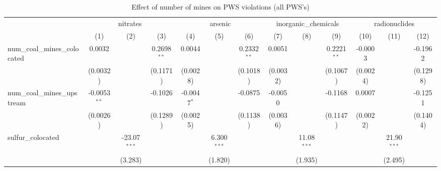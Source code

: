 
\begin{table}[htbp]
   \caption{\label{olsrf2sls_nummine_mine_vio_binary_1985to2005allhucs} Effect of number of mines on PWS violations (all PWS's)}
   \bigskip
   \centering
   \begin{adjustbox}{width = \textwidth, center}
      \begin{tabular}{lcccccccccccc}
         \toprule
          & \multicolumn{3}{c}{nitrates} & \multicolumn{3}{c}{arsenic} & \multicolumn{3}{c}{inorganic\_chemicals} & \multicolumn{3}{c}{radionuclides}\\
                                                            & (1)            & (2)            & (3)           & (4)           & (5)            & (6)           & (7)           & (8)            & (9)           & (10)                  & (11)          & (12)\\  
         \midrule 
         num\_coal\_mines\_colocated                        & 0.0032         &                & 0.2698$^{**}$ & 0.0044        &                & 0.2332$^{**}$ & 0.0051        &                & 0.2221$^{**}$ & -0.0003               &               & -0.1962\\   
                                                            & (0.0032)       &                & (0.1171)      & (0.0028)      &                & (0.1018)      & (0.0032)      &                & (0.1067)      & (0.0024)              &               & (0.1298)\\   
         num\_coal\_mines\_upstream                         & -0.0053$^{**}$ &                & -0.1026       & -0.0047$^{*}$ &                & -0.0875       & -0.0050       &                & -0.1168       & 0.0007                &               & -0.1251\\   
                                                            & (0.0026)       &                & (0.1289)      & (0.0025)      &                & (0.1138)      & (0.0036)      &                & (0.1147)      & (0.0022)              &               & (0.1404)\\   
         sulfur\_colocated                                  &                & -23.07$^{***}$ &               &               & 6.300$^{***}$  &               &               & 11.08$^{***}$  &               &                       & 21.90$^{***}$ &   \\   
                                                            &                & (3.283)        &               &               & (1.820)        &               &               & (1.935)        &               &                       & (2.495)       &   \\   

\end{tabular}
\end{adjustbox}
\end{table}
